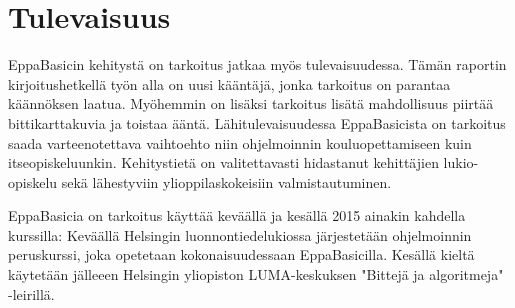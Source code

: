 \section{Tulevaisuus}
EppaBasicin kehitystä on tarkoitus
jatkaa myös tulevaisuudessa.
Tämän raportin kirjoitushetkellä työn alla
on uusi kääntäjä,
jonka tarkoitus on parantaa käännöksen laatua.
Myöhemmin on lisäksi tarkoitus lisätä
mahdollisuus piirtää bittikarttakuvia
ja toistaa ääntä.
Lähitulevaisuudessa EppaBasicista on tarkoitus
saada varteenotettava vaihtoehto niin ohjelmoinnin
kouluopettamiseen kuin itseopiskeluunkin.
Kehitystietä on valitettavasti hidastanut kehittäjien
lukio-opiskelu sekä lähestyviin ylioppilaskokeisiin
valmistautuminen.

EppaBasicia on tarkoitus käyttää keväällä
ja kesällä 2015 ainakin kahdella kurssilla:
Keväällä Helsingin luonnontiedelukiossa
järjestetään ohjelmoinnin peruskurssi,
joka opetetaan kokonaisuudessaan
EppaBasicilla.
Kesällä kieltä käytetään jälleeen
Helsingin yliopiston LUMA-keskuksen
"Bittejä ja algoritmeja" -leirillä.